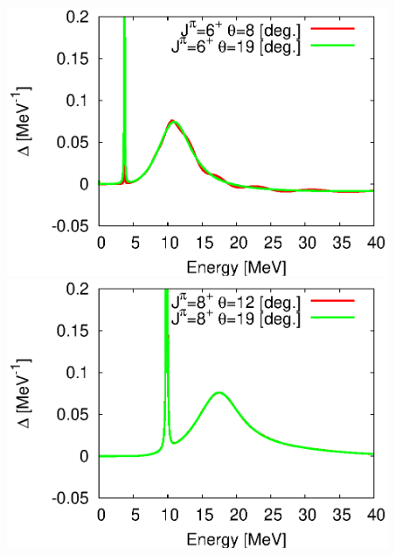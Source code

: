 \documentclass[english,a4paper]{jsarticle}
\begin{document}
\begin{figure}
  \begin{minipage}{0.5\textwidth}
    \includegraphics[width=1.0\textwidth,clip]{../cld_j6_n60_b0.11_g1.17_th8^19.eps}
  \end{minipage}
  \begin{minipage}{0.5\textwidth}
    \includegraphics[width=1.0\textwidth,clip]{../cld_j8_n60_b0.11_g1.17_th12^19.eps}
  \end{minipage}
\end{figure}
\hspace{0mm}
\end{document}

